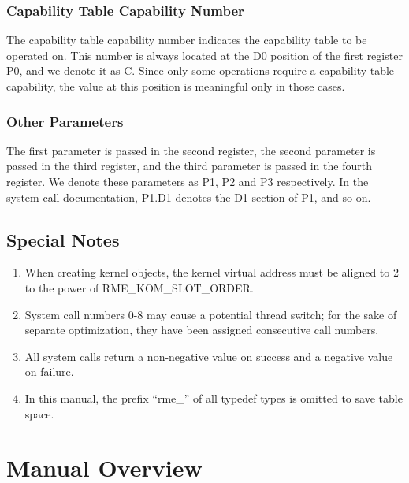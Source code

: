 \subsubsection{Capability Table Capability Number}\label{subsubsec:1-capability-table-number}

The capability table capability number indicates the capability table to be operated on. This number is always located at the D0 position of the first register P0, and we denote it as C. Since only some operations require a capability table capability, the value at this position is meaningful only in those cases.

\subsubsection{Other Parameters}\label{subsubsec:1-other-parameters}

The first parameter is passed in the second register, the second parameter is passed in the third register, and the third parameter is passed in the fourth register. We denote these parameters as P1, P2 and P3 respectively. In the system call documentation, P1.D1 denotes the D1 section of P1, and so on.

\subsection{Special Notes}\label{subsec:1-special-notes}

\begin{enumerate}
\def\labelenumi{\arabic{enumi}.}
\item
  When creating kernel objects, the kernel virtual address must be aligned to 2 to the power of RME\_KOM\_SLOT\_ORDER.
\item
  System call numbers 0-8 may cause a potential thread switch; for the sake of separate optimization, they have been assigned consecutive call numbers.
\item
  All system calls return a non-negative value on success and a negative value on failure.
\item
  In this manual, the prefix ``rme\_'' of all typedef types is omitted to save table space.
\end{enumerate}

\section{Manual Overview}\label{sec:1-manual-overview}

